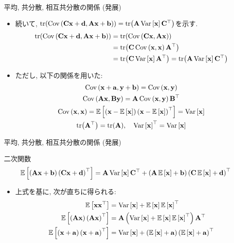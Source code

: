 \documentclass[dvipdfmx,notheorems,t]{beamer}
\begin{document}
\begin{frame}{平均, 共分散, 相互共分散の関係 (発展)}
\begin{itemize}
  \item 続いて, $\tr(\Cov{\vb{C} \vb{x} + \vb{d}}{\vb{A} \vb{x} + \vb{b}})
    = \tr(\vb{A} \Var{\vb{x}} \vb{C}^\top)$を示す.
  \begin{align*}
    \tr(\Cov{\vb{C} \vb{x} + \vb{d}}{\vb{A} \vb{x} + \vb{b}})
    &= \tr(\Cov{\vb{C} \vb{x}}{\vb{A} \vb{x}}) \\
    &= \tr(\vb{C} \Cov{\vb{x}}{\vb{x}} \vb{A}^\top) \\
    &= \tr(\vb{C} \Var{\vb{x}} \vb{A}^\top)
    = \tr(\vb{A} \Var{\vb{x}} \vb{C}^\top)
  \end{align*}
  \item ただし, 以下の関係を用いた:
  \begin{gather*}
    \Cov{\vb{x} + \vb{a}}{\vb{y} + \vb{b}} = \Cov{\vb{x}}{\vb{y}} \\
    \Cov{\vb{A} \vb{x}}{\vb{B} \vb{y}} = \vb{A} \Cov{\vb{x}}{\vb{y}} \vb{B}^\top \\
    \Cov{\vb{x}}{\vb{x}} = \E{\left( \vb{x} - \E{\vb{x}} \right)
      \left( \vb{x} - \E{\vb{x}} \right)^\top} = \Var{\vb{x}} \\
    \tr(\vb{A}^\top) = \tr(\vb{A}), \quad \Var{\vb{x}}^\top = \Var{\vb{x}}
  \end{gather*}
\end{itemize}
\end{frame}

\begin{frame}{平均, 共分散, 相互共分散の関係 (発展)}
\begin{block}{二次関数}
  \begin{align*}
    \E{\left( \vb{A} \vb{x} + \vb{b} \right) \left( \vb{C} \vb{x} + \vb{d} \right)^\top}
    = \vb{A} \Var{\vb{x}} \vb{C}^\top
    + \left( \vb{A} \E{\vb{x}} + \vb{b} \right)
      \left( \vb{C} \E{\vb{x}} + \vb{d} \right)^\top
  \end{align*}
\end{block}

\begin{itemize}
  \item 上式を基に, 次が直ちに得られる:
  \begin{align*}
    \E{\vb{x} \vb{x}^\top} &= \Var{\vb{x}} + \E{\vb{x}} \E{\vb{x}}^\top \\
    \E{\left( \vb{A} \vb{x} \right) \left( \vb{A} \vb{x} \right)^\top}
      &= \vb{A} \left( \Var{\vb{x}} + \E{\vb{x}} \E{\vb{x}}^\top \right) \vb{A}^\top \\
    \E{\left( \vb{x} + \vb{a} \right) \left( \vb{x} + \vb{a} \right)^\top}
      &= \Var{\vb{x}} + \left( \E{\vb{x}} + \vb{a} \right) \left( \E{\vb{x}} + \vb{a} \right)^\top
  \end{align*}
\end{itemize}
\end{frame}
\end{document}
